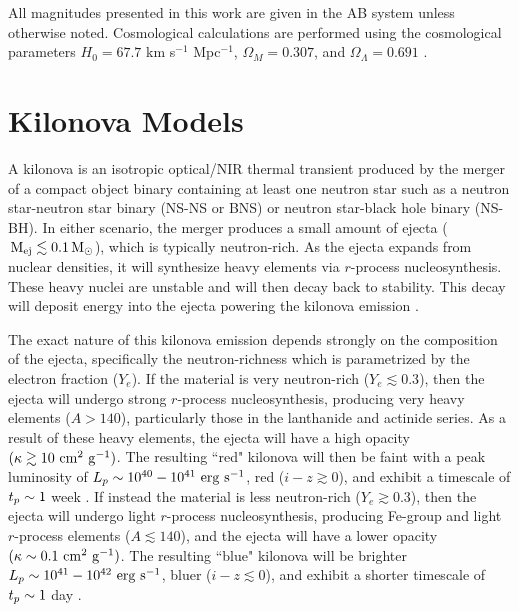 All magnitudes presented in this work are given in the AB system unless otherwise noted. Cosmological calculations are performed using the cosmological parameters $H_0 = 67.7$ km s$^{-1}$ Mpc$^{-1}$, $\Omega_M = 0.307$, and $\Omega_{\Lambda} = 0.691$ \citep{Planck2016}.

\clearpage
\section{Kilonova Models}
\label{sec:ch6_models}
A kilonova is an isotropic optical/NIR thermal transient produced by the merger of a compact object binary containing at least one neutron star such as a neutron star-neutron star binary (NS-NS or BNS) or neutron star-black hole binary (NS-BH). In either scenario, the merger produces a small amount of ejecta ($\rm\,M_{\rm ej} \lesssim 0.1 {\rm\,M_\odot}$), which is typically neutron-rich. As the ejecta expands from nuclear densities, it will synthesize heavy elements via $r$-process nucleosynthesis. These heavy nuclei are unstable and will then decay back to stability. This decay will deposit energy into the ejecta powering the kilonova emission \citep{LP98,Metzger+10,BarnesKasen13,TanakaHotokezaka13,Metzger2017}.

The exact nature of this kilonova emission depends strongly on the composition of the ejecta, specifically the neutron-richness which is parametrized by the electron fraction ($Y_e$). If the material is very neutron-rich ($Y_e \lesssim 0.3$), then the ejecta will undergo strong $r$-process nucleosynthesis, producing very heavy elements ($A > 140$), particularly those in the lanthanide and actinide series. As a result of these heavy elements, the ejecta will have a high opacity $(\kappa \gtrsim 10 \rm\ cm^2\ g^{-1})$. The resulting ``red" kilonova will then be faint with a peak luminosity of $L_p \sim 10^{40}-10^{41} \rm\ erg\ s^{-1}$, red ($i-z \gtrsim 0$), and exhibit a timescale of $t_p \sim 1$ week \citep{BarnesKasen13,TanakaHotokezaka13}. If instead the material is less neutron-rich ($Y_e \gtrsim 0.3$), then the ejecta will undergo light $r$-process nucleosynthesis, producing Fe-group and light $r$-process elements ($A \lesssim 140$), and the ejecta will have a lower opacity $(\kappa \sim 0.1 \rm\ cm^2\ g^{-1})$. The resulting ``blue" kilonova will be brighter $L_p \sim 10^{41}-10^{42} \rm\ erg\ s^{-1}$, bluer ($i-z \lesssim 0$), and exhibit a shorter timescale of $t_p \sim 1$ day \citep{Metzger+10,MetzgerFernandez14}.

